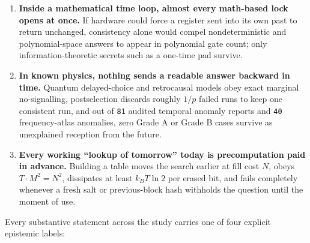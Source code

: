 \documentclass[10pt,letterpaper]{article}
\providecommand{\tightlist}{\setlength{\itemsep}{1pt}\setlength{\parskip}{0pt}}
\begin{document}
\begin{enumerate}
\def\labelenumi{\arabic{enumi}.}
\tightlist
\item
  \textbf{Inside a mathematical time loop, almost every math-based lock
  opens at once.} If hardware could force a register sent into its own
  past to return unchanged, consistency alone would compel
  nondeterministic and polynomial-space answers to appear in polynomial
  gate count; only information-theoretic secrets such as a one-time pad
  survive.
\item
  \textbf{In known physics, nothing sends a readable answer backward in
  time.} Quantum delayed-choice and retrocausal models obey exact
  marginal no-signalling, postselection discards roughly \(1/p\) failed
  runs to keep one consistent run, and out of \texttt{81} audited
  temporal anomaly reports and \texttt{40} frequency-atlas anomalies,
  zero Grade A or Grade B cases survive as unexplained reception from
  the future.
\item
  \textbf{Every working ``lookup of tomorrow'' today is precomputation
  paid in advance.} Building a table moves the search earlier at fill
  cost \(N\), obeys \(T \cdot M^2 = N^2\), dissipates at least
  \(k_B T \ln 2\) per erased bit, and fails completely whenever a fresh
  salt or previous-block hash withholds the question until the moment of
  use.
\end{enumerate}

Every substantive statement across the study carries one of four
explicit epistemic labels:
\end{document}
